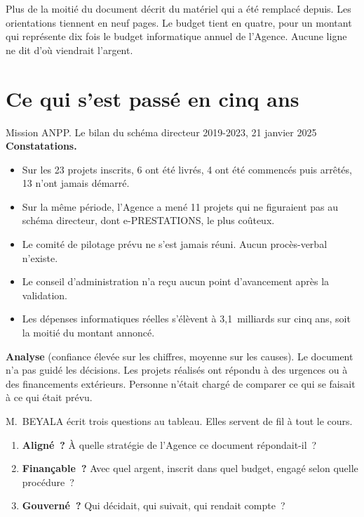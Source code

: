 Plus de la moitié du document décrit du matériel qui a été remplacé depuis. Les orientations tiennent en neuf
pages. Le budget tient en quatre, pour un montant qui représente dix fois le budget informatique annuel de
l'Agence. Aucune ligne ne dit d'où viendrait l'argent.

\section{Ce qui s'est passé en cinq ans}
\label{sec:p-bilan}

\begin{boxscenario}{Mission ANPP. Le bilan du schéma directeur 2019-2023, 21 janvier 2025}
\textbf{Constatations.}
\begin{itemize}
    \item Sur les 23 projets inscrits, 6 ont été livrés, 4 ont été commencés puis arrêtés, 13 n'ont jamais
          démarré.
    \item Sur la même période, l'Agence a mené 11 projets qui ne figuraient pas au schéma directeur, dont
          e-PRESTATIONS, le plus coûteux.
    \item Le comité de pilotage prévu ne s'est jamais réuni. Aucun procès-verbal n'existe.
    \item Le conseil d'administration n'a reçu aucun point d'avancement après la validation.
    \item Les dépenses informatiques réelles s'élèvent à 3,1~milliards sur cinq ans, soit la moitié du montant
          annoncé.
\end{itemize}

\textbf{Analyse} (confiance élevée sur les chiffres, moyenne sur les causes). Le document n'a pas guidé les
décisions. Les projets réalisés ont répondu à des urgences ou à des financements extérieurs. Personne n'était
chargé de comparer ce qui se faisait à ce qui était prévu.
\end{boxscenario}

M.~BEYALA écrit trois questions au tableau. Elles servent de fil à tout le cours.

\begin{enumerate}
    \item \textbf{Aligné~?} À quelle stratégie de l'Agence ce document répondait-il~?
    \item \textbf{Finançable~?} Avec quel argent, inscrit dans quel budget, engagé selon quelle procédure~?
    \item \textbf{Gouverné~?} Qui décidait, qui suivait, qui rendait compte~?
\end{enumerate}

